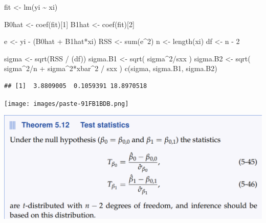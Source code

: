 \documentclass[
]{article}
\newenvironment{Shaded}{\begin{snugshade}}{\end{snugshade}}
\newcommand{\DecValTok}[1]{\textcolor[rgb]{0.00,0.00,0.81}{#1}}
\newcommand{\FunctionTok}[1]{\textcolor[rgb]{0.00,0.00,0.00}{#1}}
\newcommand{\NormalTok}[1]{#1}
\newcommand{\OtherTok}[1]{\textcolor[rgb]{0.56,0.35,0.01}{#1}}
\newcommand{\SpecialCharTok}[1]{\textcolor[rgb]{0.00,0.00,0.00}{#1}}
\begin{document}
\begin{Shaded}
\begin{Highlighting}[]
\NormalTok{fit }\OtherTok{\textless{}{-}} \FunctionTok{lm}\NormalTok{(yi }\SpecialCharTok{\textasciitilde{}}\NormalTok{ xi)}

\NormalTok{B0hat }\OtherTok{\textless{}{-}} \FunctionTok{coef}\NormalTok{(fit)[}\DecValTok{1}\NormalTok{]}
\NormalTok{B1hat }\OtherTok{\textless{}{-}} \FunctionTok{coef}\NormalTok{(fit)[}\DecValTok{2}\NormalTok{]}

\NormalTok{e }\OtherTok{\textless{}{-}}\NormalTok{ yi }\SpecialCharTok{{-}}\NormalTok{ (B0hat }\SpecialCharTok{+}\NormalTok{ B1hat}\SpecialCharTok{*}\NormalTok{xi)}
\NormalTok{RSS }\OtherTok{\textless{}{-}} \FunctionTok{sum}\NormalTok{(e}\SpecialCharTok{\^{}}\DecValTok{2}\NormalTok{)}
\NormalTok{n }\OtherTok{\textless{}{-}} \FunctionTok{length}\NormalTok{(xi)}
\NormalTok{df }\OtherTok{\textless{}{-}}\NormalTok{ n }\SpecialCharTok{{-}} \DecValTok{2}

\NormalTok{sigma }\OtherTok{\textless{}{-}} \FunctionTok{sqrt}\NormalTok{(RSS }\SpecialCharTok{/}\NormalTok{ (df))}
\NormalTok{sigma.B1 }\OtherTok{\textless{}{-}} \FunctionTok{sqrt}\NormalTok{( sigma}\SpecialCharTok{\^{}}\DecValTok{2}\SpecialCharTok{/}\NormalTok{sxx )}
\NormalTok{sigma.B2 }\OtherTok{\textless{}{-}} \FunctionTok{sqrt}\NormalTok{( sigma}\SpecialCharTok{\^{}}\DecValTok{2}\SpecialCharTok{/}\NormalTok{n }\SpecialCharTok{+}\NormalTok{ sigma}\SpecialCharTok{\^{}}\DecValTok{2}\SpecialCharTok{*}\NormalTok{xbar}\SpecialCharTok{\^{}}\DecValTok{2} \SpecialCharTok{/}\NormalTok{ sxx )}
\FunctionTok{c}\NormalTok{(sigma, sigma.B1, sigma.B2)}
\end{Highlighting}
\end{Shaded}

\begin{verbatim}
## [1]  3.8809005  0.1059391 18.8970518
\end{verbatim}

\texttt{[image: images/paste-91FB1BDB.png]}

\includegraphics{images/paste-D0E70AC5.png}
\end{document}
